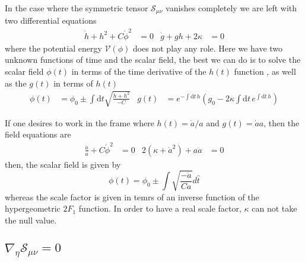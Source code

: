 \documentclass[10pt,a4paper]{article}
\begin{document}
In the case where the symmetric tensor $\mathcal{S}_{\mu\nu}$ vanishes completely we are left with two differential equations
\begin{align}
  \dot{h} + h^2 + C\dot{\phi}^2 & = 0 & \dot{g} + gh + 2\kappa & = 0
\end{align}
where the potential energy $\mathcal{V}(\phi)$ does not play any role. Here we have two unknown functions of time and the scalar field, the best we 
can do is to solve the scalar field $\phi(t)$ in terms of the time derivative of the $h(t)$ function , as well as the $g(t)$ in terms of $h(t)$
\begin{align}
  \phi(t) & = \phi_0 \pm \int \mathrm{d}t \sqrt{\frac{\dot{h} + h^2}{-C}} & 
  g(t) & = e^{- \int \mathrm{d}t \, h} \left( g_0 - 2 \kappa \int \mathrm{d}t \, e^{\int \mathrm{d}t \, h} \right)
\end{align}

If one desires to work in the frame where $h(t) = \dot{a}/a$ and $g(t) = \dot{a}a$, then the field equations are
\begin{align}
  \frac{\ddot{a}}{a} + C\dot{\phi}^2 & = 0 & 2\left(\kappa + \dot{a}^2\right) + a\ddot{a} & = 0
\end{align}
then, the scalar field is given by
\begin{equation}
  \phi(t) = \phi_0 \pm \int \sqrt{\frac{-\ddot{a}}{Ca}}d\hat{t}
\end{equation}
whereas the scale factor is given in temrs of an inverse function of the hypergeometric $2F_1$ function. In order to have a real scale factor, $\kappa$ 
can not take the null value.


\subsection{$\nabla_{\eta} \mathcal{S}_{\mu\nu} = 0 $}
\end{document}
